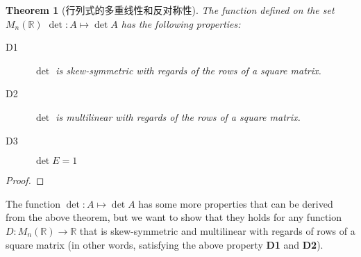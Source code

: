 \documentclass[onecolumn]{ctexart}
\newtheorem{theorem}{Theorem}
\begin{document}
\begin{theorem}[行列式的多重线性和反对称性]
  The function defined on the set $M_n(\mathbb{R})$ $\det: A \mapsto \det A$ has 
  the following properties:
  \begin{description}
    \item[D1] $\det$ is skew-symmetric with regards of the rows of a square 
    matrix.
    \item[D2] $\det$ is multilinear with regards of the rows of a square matrix.
    \item[D3] $\det E = 1$
  \end{description}
\end{theorem}
\begin{proof}
  
\end{proof}

The function $\det: A \mapsto \det A$ has some more properties that can be 
derived from the above theorem, but we want to show that they holds for any 
function $D: M_n(\mathbb{R}) \to \mathbb{R}$ that is skew-symmetric and 
multilinear with regards of rows of a square matrix (in other words, satisfying 
the above property \textbf{D1} and \textbf{D2}).
\end{document}
